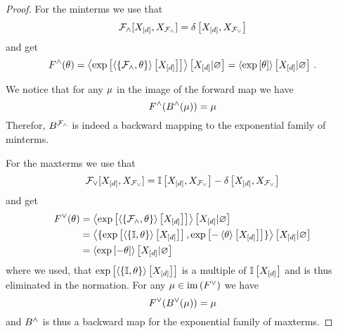\begin{proof}
	For the minterms we use that
		\[ \mathcal{F}_{\land}[X_{[d]},X_{\mathcal{F}_{\land}}]  = \delta\left[X_{[d]},X_{\mathcal{F}_{\lor}}\right]\] 
	and get
		\[ F^{\land}(\theta) 
		= \left\langle 
		\mathrm{exp}\left[\left\langle \{\mathcal{F}_{\land}, \theta\}\right\rangle \left[ X_{[d]} \right]\right]
		\right\rangle \left[ X_{[d]} | \varnothing \right]
		= 
		\left\langle \mathrm{exp}\left[\theta\right]\right\rangle \left[ X_{[d]} | \varnothing \right] \, . 
		\]
	
	We notice that for any $\mu$ in the image of the forward map we have
		\[ F^{\land}(B^{\land}(\mu)) = \mu \]
	Therefor, $B^{\mathcal{F}_{\land}}$ is indeed a backward mapping to the exponential family of minterms.
	
	For the maxterms we use that
		\[ \mathcal{F}_{\lor}[X_{[d]},X_{\mathcal{F}_{\lor}}] = \mathbb{I}\left[X_{[d]},X_{\mathcal{F}_{\lor}}\right]-\delta\left[X_{[d]},X_{\mathcal{F}_{\lor}}\right] \]
	and get
	\begin{align*}
		F^{\lor}(\theta) 
		& = \left\langle 
		\mathrm{exp}\left[\left\langle \{\mathcal{F}_{\land}, \theta\}\right\rangle \left[ X_{[d]} \right]\right]
		\right\rangle \left[ X_{[d]} | \varnothing \right] \\
		& = \left\langle \{
		\mathrm{exp}\left[\left\langle \{\mathbb{I}, \theta\}\right\rangle \left[ X_{[d]} \right]\right], 
		\mathrm{exp}\left[-\left\langle \theta\right\rangle \left[ X_{[d]} \right]\right] \}
		\right\rangle \left[ X_{[d]} | \varnothing \right] \\
		& = \left\langle 
		\mathrm{exp}\left[-\theta\right]
		\right\rangle \left[ X_{[d]} | \varnothing \right]
	\end{align*}
	where we used, that $\mathrm{exp}\left[\left\langle \{\mathbb{I}, \theta\}\right\rangle \left[ X_{[d]} \right]\right]$ is a multiple of $\mathbb{I}\left[X_{[d]}\right]$ and is thus eliminated in the normation.
	For any $\mu\in\mathrm{im}\left(F^{\lor}\right)$ we have
		\[ F^{\lor}(B^{\lor}(\mu) ) 
		= \mu
		\]
	and $B^{\land}$ is thus a backward map for the exponential family of maxterms.
\end{proof}



